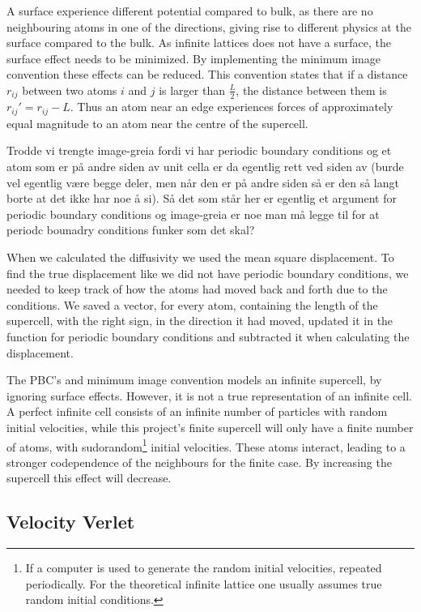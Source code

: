 A surface experience different potential compared to bulk, as there are no neighbouring atoms in one of the directions, giving rise to different physics at the surface compared to the bulk. As infinite lattices does not have a surface, the surface effect needs to be minimized. By implementing the minimum image convention these effects can be reduced. This convention states that if a distance $ r_{ij} $ between two atoms $ i $ and $ j $ is larger than $ \frac{L}{2} $, the distance between them is $  r_{ij}'  = r_{ij}-L$. Thus an atom  near an edge experiences forces of approximately equal magnitude to an atom near the centre of the supercell. 

Trodde vi trengte image-greia fordi vi har periodic boundary conditions og et atom som er på andre siden av unit cella er da egentlig rett ved siden av (burde vel egentlig være begge deler, men når den er på andre siden så er den så langt borte at det ikke har noe å si). Så det som står her er egentlig et argument for periodic boundary conditions og image-greia er noe man må legge til for at periodc bounadry conditions funker som det skal?

When we calculated the diffusivity we used the mean square displacement. To find the true displacement like we did not have periodic boundary conditions, we needed to keep track of how the atoms had moved back and forth due to the conditions. We saved a vector, for every atom, containing the length of the supercell, with the right sign, in the direction it had moved, updated it in the function for periodic boundary conditions and subtracted it when calculating the displacement. 

The PBC's and minimum image convention models an infinite supercell, by ignoring surface effects. However, it is not a true representation of an infinite cell. A perfect infinite cell consists of an infinite number of particles with random initial velocities, while this project's finite supercell will only have a finite number of atoms, with sudorandom\footnote{If a computer is used to generate the random initial velocities, repeated periodically. For the theoretical infinite lattice one usually assumes true random initial conditions.} initial velocities. These atoms interact, leading to a stronger codependence of the neighbours for the finite case. By increasing the supercell this effect will decrease.   	



\subsection{Velocity Verlet}

